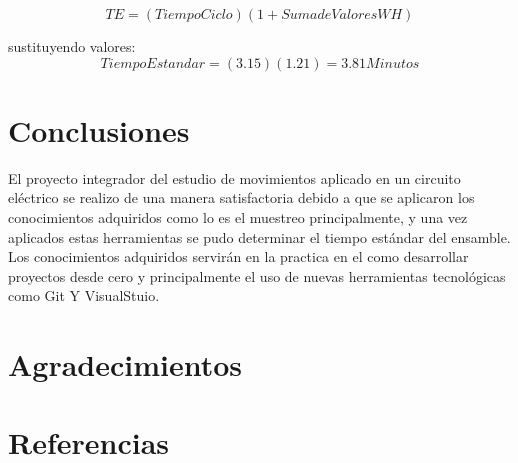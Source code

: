     \begin{equation}
        TE= (Tiempo Ciclo)(1 + Suma de Valores WH)
    \end{equation}
    
    sustituyendo valores:
    \begin{equation}
        Tiempo Estandar= (3.15)(1.21)=3.81 Minutos
    \end{equation}
    
    \section{Conclusiones}
    
    El proyecto integrador del estudio de movimientos aplicado en un circuito eléctrico se realizo de una manera satisfactoria debido a que se aplicaron los conocimientos adquiridos como lo es el muestreo principalmente, y una vez aplicados estas herramientas se pudo determinar el tiempo estándar del ensamble.
    Los conocimientos adquiridos servirán en la practica en el como desarrollar proyectos desde cero y principalmente el uso de nuevas herramientas tecnológicas como Git Y VisualStuio.
    
    \section{Agradecimientos}
    
    
    \section*{Referencias}
    
    
    
    

